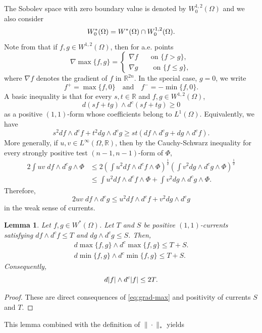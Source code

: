 \documentclass{amsart}
\newcommand{\Om}{\Omega}
\newcommand{\na}{\nabla}
\newcommand{\bR}{\mathbb{R}}
\newtheorem{lem}[thm]{Lemma}
\theoremstyle{definition}
\numberwithin{thm}{section}
\numberwithin{equation}{section}
\renewcommand{\[}{\begin{equation}}
\renewcommand{\]}{\end{equation}}
\newcommand{\wed}{\wedge}
\begin{document}
The Sobolev space with zero boundary value is denoted by  $W^{1,2}_0(\Om)$ and we also consider
\[\notag
	W_0^*(\Om) = W^*(\Om) \cap W^{1,2}_0(\Om).
\]
Note from \cite[Lemma~7.6]{GT} that if $f,g \in W^{1,2}(\Om)$, then for a.e. points 
\[\label{eq:grad-max}
	 \na \max\{f, g\} = \begin{cases}
	\na f \quad &\mbox{on } \{f> g\}, \\
	\na g \quad &\mbox{ on } \{ f \leq g \},
	\end{cases}
\]
where $\na f$ denotes the gradient of $f$ in $\bR^{2n}$. 
In the special case, $g=0$, we write $$f^+ = \max\{f,0\} \quad\text{and}\quad f^- = -\min\{f, 0\}.$$
A basic inequality is that for every $s, t\in \bR$ and $f, g\in W^{1,2}(\Om)$,  
$$d(sf+tg) \wed d^c (sf+tg) \geq 0$$ 
as a positive $(1,1)$-form whose coefficients belong to $L^1(\Om)$. Equivalently, we have
\[\label{eq:basic-ineq}
	s^2df \wed d^c f + t^2 dg\wed d^c g \geq st (df \wed d^c g + dg\wed d^c f).
\]
More generally, if $u, v \in L^\infty(\Om,\bR)$, then by the Cauchy-Schwarz inequality for every strongly positive test $(n-1, n-1)$-form of $\Phi$,
$$\begin{aligned}
	2 \int u v \;d f \wed d^c g \wed \Phi  &\leq 2  \left( \int u^2 df \wed d^c f \wed \Phi \right)^\frac{1}{2} \left(  \int v^2 dg \wed d^c g \wed \Phi \right)^\frac{1}{2} \\
&\leq \int u^2 df \wed d^c f \wed \Phi + \int v^2 dg \wed d^c g \wed \Phi.
\end{aligned}$$
Therefore,
\[\label{eq:basic-ineq-cs}
	2 uv \;df \wed d^c g \leq u^2 df \wed d^c f + v^2 dg \wed d^c g
\]
in the weak sense of currents.

\begin{lem}\label{lem:ineq-max-min} Let $f, g \in W^*(\Om)$. Let $T$ and $S$ be positive $(1,1)$-currents satisfying $df\wed d^cf \leq T$ and $dg\wed d^c g\leq S$. Then,
$$\begin{aligned}
	d \max\{f,g\} \wed d^c\max\{f,g\} \leq  	T +   S. \\
	d \min\{f,g\} \wed d^c\min\{f,g\} \leq  	T + S. 
\end{aligned}$$
Consequently, 
\[\notag	d |f| \wed d^c|f| \leq 2 T.
\]
\end{lem}

\begin{proof} These are direct consequences of \eqref{eq:grad-max} and positivity of currents $S$ and $T$.
\end{proof}

This lemma combined with the definition of  $\|\cdot\|_*$ yields
\end{document}
